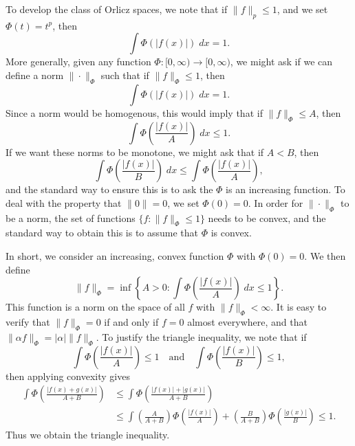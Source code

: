 To develop the class of Orlicz spaces, we note that if $\| f \|_p \leq 1$, and we set $\Phi(t) = t^p$, then
%
\[ \int \Phi \left( |f(x)| \right)\; dx = 1. \]
%
More generally, given any function $\Phi: [0,\infty) \to [0,\infty)$, we might ask if we can define a norm $\| \cdot \|_\Phi$ such that if $\| f \|_\Phi \leq 1$, then
%
\[ \int \Phi \left( |f(x)| \right)\; dx = 1. \]
%
Since a norm would be homogenous, this would imply that if $\| f \|_\Phi \leq A$, then
%
\[ \int \Phi \left( \frac{|f(x)|}{A} \right)\; dx \leq 1. \]
%
If we want these norms to be monotone, we might ask that if $A < B$, then
%
\[ \int \Phi \left( \frac{|f(x)|}{B} \right)\; dx \leq \int \Phi \left( \frac{|f(x)|}{A} \right), \]
%
and the standard way to ensure this is to ask the $\Phi$ is an increasing function. To deal with the property that $\| 0 \| = 0$, we set $\Phi(0) = 0$. In order for $\| \cdot \|_\Phi$ to be a norm, the set of functions $\{ f : \| f \|_\Phi \leq 1 \}$ needs to be convex, and the standard way to obtain this is to assume that $\Phi$ is convex.

In short, we consider an increasing, convex function $\Phi$ with $\Phi(0) = 0$. We then define
%
\[ \| f \|_\Phi = \inf \left\{ A > 0 : \int \Phi \left( \frac{|f(x)|}{A} \right)\; dx \leq 1 \right\}. \]
%
This function is a norm on the space of all $f$ with $\| f \|_\Phi < \infty$. It is easy to verify that $\| f \|_\Phi = 0$ if and only if $f = 0$ almost everywhere, and that $\| \alpha f \|_\Phi = |\alpha| \| f \|_\Phi$. To justify the triangle inequality, we note that if
%
\[ \int \Phi \left( \frac{|f(x)|}{A} \right) \leq 1 \quad\text{and} \quad \int \Phi \left( \frac{|f(x)|}{B} \right) \leq 1, \]
%
then applying convexity gives
%
\begin{align*}
    \int \Phi \left( \frac{|f(x) + g(x)|}{A + B} \right) &\leq \int \Phi \left( \frac{|f(x)| + |g(x)|}{A + B} \right)\\
    &\leq \int \left( \frac{A}{A + B} \right) \Phi \left( \frac{|f(x)|}{A} \right) + \left( \frac{B}{A + B} \right) \Phi \left( \frac{|g(x)|}{B} \right) \leq 1.
\end{align*}
%
Thus we obtain the triangle inequality.

